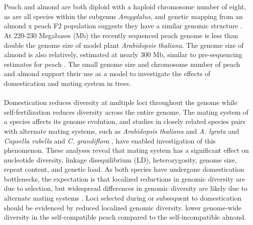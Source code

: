 \documentclass[12pt]{article}
\begin{document}
%
\\
\\
Peach and almond are both diploid with a haploid chromosome number of eight, as are all species within the subgenus \emph{Amygdalus}, and genetic mapping from an almond x peach F2 population suggests they have a similar genomic structure \citep{dirlewanger2004comparative}. 
%
At 220-230 Megabases (Mb) the recently sequenced peach genome \citep{verde2013high} is less than double the genome size of model plant \emph{Arabidopsis thaliana}.
%
The genome size of almond is also relatively, estimated at  nearly 300 Mb, similar to pre-sequencing estimates for peach \citep{arumuganathan1991nuclear}. 
%
The small genome size and chromosome number of peach and almond support their use as a model to investigate the effects of domestication and mating system in trees.
%
\\
\\
Domestication reduces diversity at multiple loci throughout the genome \citep{glemin2006impact, doebley2006molecular, slotte2013capsella} while self-fertilization reduces diversity across the entire genome.
%
The mating system of a species affects its genome evolution, and studies in closely related species pairs with alternate mating systems, such as \emph{Arabidopsis thaliana} and \emph{A. lyrata} and \emph{Capsella rubella} and \emph{C. grandiflora} \citep{slotte2013capsella}, have enabled investigation of this phenomenon. 
%
These analyses reveal that mating system has a significant effect on nucleotide diversity, linkage disequilibrium (LD), heterozygosity, genome size, repeat content, and genetic load. 
%
As both species have undergone domestication bottlenecks, the expectation is that localized reductions in genomic diversity are due to selection, but widespread differences in genomic diversity are likely due to alternate mating systems \citep{glemin2006impact, charlesworth2001breeding}. 
%
Loci selected during or subsequent to domestication should be evidenced by reduced localized genomic diversity.
%
lower genome-wide diversity in the self-compatible peach compared to the self-incompatible almond.
%
\end{document}
